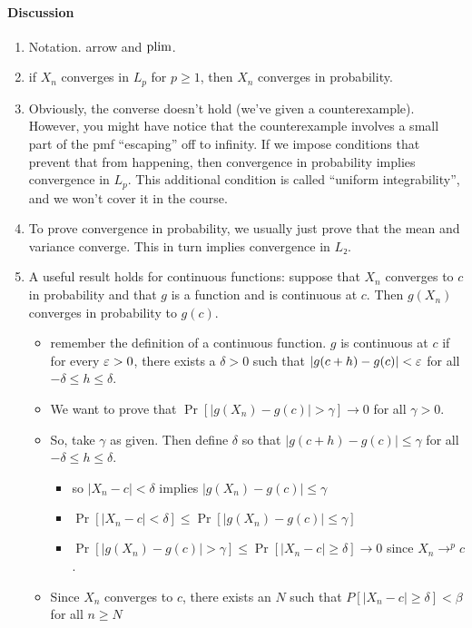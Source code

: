 \paragraph{Discussion}
\begin{enumerate}
\item Notation. arrow and $\operatorname*{plim}$.
\item if $X_n$ converges in $L_p$ for $p ≥ 1$, then $X_n$
          converges in probability.
\item Obviously, the converse doesn't hold (we've given a
          counterexample).  However, you might have notice that the
          counterexample involves a small part of the pmf ``escaping'' off
          to infinity.  If we impose conditions that prevent that from
          happening, then convergence in probability implies convergence
          in $L_p$.  This additional condition is called ``uniform
          integrability'', and we won't cover it in the course.
\item To prove convergence in probability, we usually just prove that
          the mean and variance converge.  This in turn implies
          convergence in $L₂$.
\item A useful result holds for continuous functions: suppose that
          $X_n$ converges to $c$ in probability and that $g$ is a
          function and is continuous at $c$.  Then $g(X_n)$ converges in
          probability to $g(c)$.
\begin{itemize}
\item remember the definition of a continuous function.  $g$ is
  continuous at $c$ if for every $\varepsilon >0$, there exists a $δ > 0$ such
  that $|g(c + h) - g(c)| < \varepsilon$ for all $-δ ≤ h ≤ δ$.
\item We want to prove that $\Pr[|g(X_n) - g(c)| > γ] → 0$ for all
  $γ > 0$.
\item So, take $γ$ as given.  Then define $δ$ so that
  $|g(c + h) - g(c)| ≤ γ$ for all $-δ ≤ h ≤ δ$.
\begin{itemize}
\item so $|X_n - c| < δ$ implies $|g(X_n) - g(c)| ≤ γ$
\item $\Pr[|X_n - c| < δ] ≤ \Pr[|g(X_n) - g(c)| ≤ γ]$
\item $\Pr[|g(X_n) - g(c)| > γ] ≤ \Pr[|X_n - c| ≥ δ] → 0$ since 
  $X_n →^p c$.
\end{itemize}
\item Since $X_n$ converges to $c$, there exists an $N$
  such that $P[|X_n - c| ≥ δ] < β$ for all $n ≥ N$

\end{itemize}
\end{enumerate}

